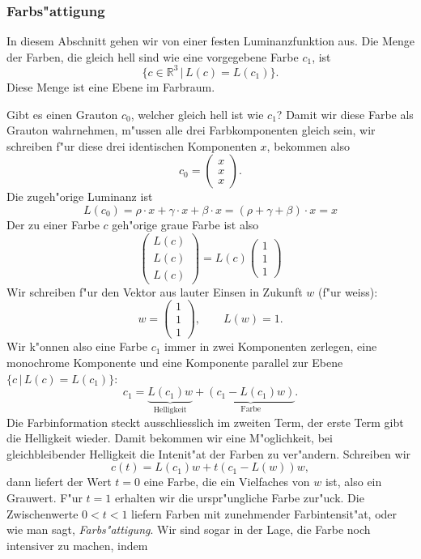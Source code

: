 \subsubsection{Farbs"attigung}
In diesem Abschnitt gehen wir von einer festen Luminanzfunktion aus.
Die Menge der Farben, die gleich hell sind wie eine vorgegebene Farbe $c_1$,
ist 
\[
\{ c\in\mathbb R^3\,|\, L(c)=L(c_1)\}.
\]
Diese Menge ist eine Ebene im Farbraum.

Gibt es einen Grauton $c_0$, welcher gleich hell ist wie $c_1$?
Damit wir diese Farbe als Grauton wahrnehmen, m"ussen alle drei Farbkomponenten
gleich sein, wir schreiben f"ur diese drei identischen Komponenten $x$,
bekommen also
\[
c_0=\begin{pmatrix}x\\x\\x\end{pmatrix}.
\]
Die zugeh"orige Luminanz ist
\[
L(c_0)=\rho\cdot x + \gamma\cdot x + \beta \cdot x=
(\rho + \gamma +\beta)\cdot x=x
\]
Der zu einer Farbe $c$ geh"orige graue Farbe ist also
\[
\begin{pmatrix}L(c)\\L(c)\\L(c)\end{pmatrix}
=
L(c)\begin{pmatrix}1\\1\\1\end{pmatrix}
\]
Wir schreiben f"ur den Vektor aus lauter Einsen in Zukunft $w$ (f"ur weiss):
\[
w=\begin{pmatrix}1\\1\\1\end{pmatrix}, \qquad L(w)=1.
\]
Wir k"onnen also eine Farbe $c_1$ immer in zwei Komponenten zerlegen,
eine monochrome Komponente und eine Komponente parallel zur Ebene
$\{ c\,|\, L(c)=L(c_1)\}$:
\[
c_1 = \underbrace{L(c_1)w}_{\text{Helligkeit}} + \underbrace{(c_1 - L(c_1)w)}_{\text{Farbe}}.
\]
Die Farbinformation steckt ausschliesslich im zweiten Term, der erste
Term gibt die Helligkeit wieder.
Damit bekommen wir eine M"oglichkeit, bei gleichbleibender Helligkeit
die Intenit"at der Farben zu ver"andern. Schreiben wir
\[
c(t)=L(c_1)w+t(c_1-L(w))w,
\]
dann liefert der Wert $t=0$ eine Farbe, die ein Vielfaches von $w$ ist, also
ein Grauwert. F"ur $t=1$ erhalten wir die urspr"ungliche Farbe zur"uck.
Die Zwischenwerte $0 < t < 1$ liefern Farben mit zunehmender Farbintensit"at,
oder wie man sagt, {\em Farbs"attigung}. 
Wir sind sogar in der Lage, die Farbe noch intensiver zu machen, indem
